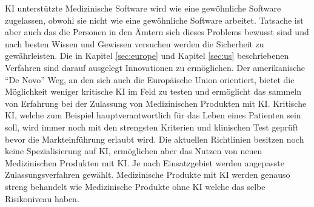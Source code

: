KI unterstützte Medizinische Software wird wie eine gewöhnliche Software zugelassen, obwohl sie nicht wie eine gewöhnliche Software arbeitet. Tatsache ist aber auch das die Personen in den Ämtern sich dieses Problems bewusst sind und nach besten Wissen und Gewissen versuchen werden die Sicherheit zu gewährleisten. Die in Kapitel \ref{sec:europe} und Kapitel \ref{sec:us} beschriebenen Verfahren sind darauf ausgelegt Innovationen zu ermöglichen. Der amerikanische "`De Novo"' Weg, an den sich auch die Europäische Union orientiert, bietet die Möglichkeit weniger kritische KI im Feld zu testen und ermöglicht das sammeln von Erfahrung bei der Zulassung von Medizinischen Produkten mit KI. Kritische KI, welche zum Beispiel hauptverantwortlich für das Leben eines Patienten sein soll, wird immer noch mit den strengsten Kriterien und klinischen Test geprüft bevor die Markteinführung erlaubt wird. Die aktuellen Richtlinien besitzen noch keine Spezialisierung auf KI, ermöglichen aber das Nutzen von neuen Medizinischen Produkten mit KI. Je nach Einsatzgebiet werden angepasste Zulassungsverfahren gewählt. Medizinische Produkte mit KI werden genauso streng behandelt wie Medizinische Produkte ohne KI welche das selbe Risikoniveau haben.
